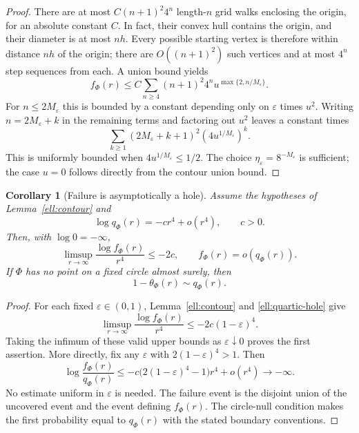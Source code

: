 \documentclass[11pt,a4paper]{article}
\newtheorem{corollary}[theorem]{Corollary}
\theoremstyle{definition}
\theoremstyle{remark}
\numberwithin{equation}{section}
\begin{document}
\begin{proof}
There are at most $C(n+1)^2 4^n$ length-$n$ grid walks enclosing
the origin, for an absolute constant $C$.  In fact, their convex
hull contains the origin, and their diameter is at most $nh$.
Every possible starting vertex is therefore within distance $nh$
of the origin; there are $O((n+1)^2)$ such vertices and at most
$4^n$ step sequences from each.  A union bound yields
\begin{equation}\label{ell:contour-series}
 f_\Phi(r)\le C\sum_{n\ge4}(n+1)^2 4^n
                  u^{\max\{2,n/M_\varepsilon\}}.
\end{equation}
For $n\le2M_\varepsilon$ this is bounded by a constant depending
only on $\varepsilon$ times $u^2$.  Writing
$n=2M_\varepsilon+k$ in the remaining terms and factoring out
$u^2$ leaves a constant times
\[
 \sum_{k\ge1}(2M_\varepsilon+k+1)^2
                   (4u^{1/M_\varepsilon})^k.
\]
This is uniformly bounded when
$4u^{1/M_\varepsilon}\le1/2$.
The choice $\eta_\varepsilon=8^{-M_\varepsilon}$ is sufficient;
the case $u=0$ follows directly from the contour union bound.
\end{proof}

\begin{corollary}[Failure is asymptotically a hole]\label{ell:hole-failure}
Assume the hypotheses of Lemma~\ref{ell:contour} and
\begin{equation}\label{ell:quartic-hole}
 \log q_\Phi(r)=-c r^4+o(r^4),\qquad c>0.
\end{equation}
Then, with $\log0=-\infty$,
\[
 \limsup_{r\to\infty}\frac{\log f_\Phi(r)}{r^4}\le-2c,
 \qquad f_\Phi(r)=o(q_\Phi(r)).
\]
If $\Phi$ has no point on a fixed circle almost surely, then
\begin{equation}\label{ell:failure-equivalence}
 1-\theta_\Phi(r)\sim q_\Phi(r).
\end{equation}
\end{corollary}

\begin{proof}
For each fixed $\varepsilon\in(0,1)$,
Lemma~\ref{ell:contour} and \eqref{ell:quartic-hole} give
\[
 \limsup_{r\to\infty}\frac{\log f_\Phi(r)}{r^4}
 \le-2c(1-\varepsilon)^4.
\]
Taking the infimum of these valid upper bounds as
$\varepsilon\downarrow0$ proves the first assertion.  More directly,
fix any $\varepsilon$ with $2(1-\varepsilon)^4>1$.  Then
\[
 \log\frac{f_\Phi(r)}{q_\Phi(r)}
 \le -c\bigl(2(1-\varepsilon)^4-1\bigr)r^4+o(r^4)
 \longrightarrow-\infty.
\]
No estimate uniform in $\varepsilon$ is needed.  The failure event
is the disjoint union of the uncovered event and the event defining
$f_\Phi(r)$.  The circle-null condition makes the first probability
equal to $q_\Phi(r)$ with the stated boundary conventions.
\end{proof}
\end{document}
